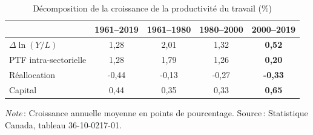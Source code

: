 \begin{table}[tbp]
\centering
\sffamily
\renewcommand{\arraystretch}{1.3}
\begin{threeparttable}
\caption{D\'ecomposition de la croissance de la productivit\'e du travail (\%)}
\label{tab:note_decomposition}
\begin{tabular}{l*{4}{c}}
\toprule
& 1961--2019 & 1961--1980 & 1980--2000 & \textbf{2000--2019} \\
\midrule
$\Delta \ln(Y/L)$ & 1,28 & 2,01 & 1,32 & \textbf{0,52} \\
\quad PTF intra-sectorielle & 1,28 & 1,79 & 1,26 & \textbf{0,20} \\
\quad R\'eallocation & -0,44 & -0,13 & -0,27 & \textbf{-0,33} \\
\quad Capital & 0,44 & 0,35 & 0,33 & \textbf{0,65} \\
\bottomrule
\end{tabular}
\begin{tablenotes}\footnotesize
\item \textit{Note}\,: Croissance annuelle moyenne en points de pourcentage. Source\,: Statistique Canada, tableau 36-10-0217-01.
\end{tablenotes}
\end{threeparttable}
\end{table}